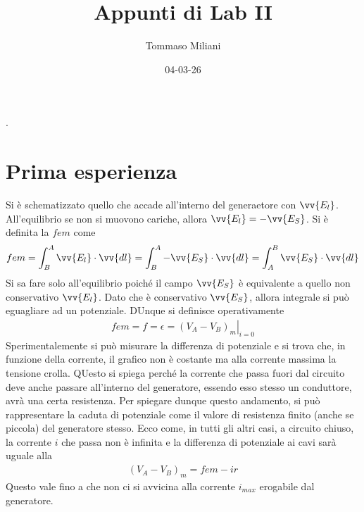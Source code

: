 \documentclass[a4paper, oneside]{article}
\title{Appunti di Lab II}
\author{Tommaso Miliani}
\date{04-03-26}
\begin{document}
                {}          %
                {}          %
                {\slshape}  %
                {}          %
                {\bfseries} %
                {.}         %
                {\newline}  %
                {}          %
\theoremstyle{theoremEnv}

\newtheorem{definition}{Definizione}[section]
\newtheorem{theorem}{Teorema}[section]
\newtheorem{lemma}{Proposizione}[section]
\newtheorem{observation}{Osservazione}[section]
\newtheorem{corollary}{Corollario}[theorem]
\newtheorem{example}{Esempio}[section]
\newtheorem{remark}{Enunciato}[section]

\maketitle

\section{Prima esperienza}
Si è schematizzato quello che accade all'interno del generaetore
con $\vv{E_l}$. All'equilibrio se non si muovono cariche, allora
$\vv{E_l} = - \vv{E_S}$. Si è definita la $fem$ come 
\begin{gather*}
    fem = \int_{B}^{A} \vv{E_l} \cdot \vv{dl}   = \int_{B}^{A} -\vv{E_S} \cdot \vv{dl} = \int_{A}^{B} \vv{E_S} \cdot \vv{dl}     
\end{gather*}   
Si sa fare solo all'equilibrio poiché il campo $\vv{E_S}$ è equivalente a quello 
non conservativo $\vv{E_l}$. Dato che è conservativo $\vv{E_S}$, allora integrale si può
eguagliare ad un potenziale. DUnque si definisce operativamente
\begin{gather*}
    fem = f = \epsilon = \left.(V_A - V_B)_m \right|_{i = 0 }
\end{gather*}
Sperimentalemente si può misurare la differenza di potenziale e si trova che, 
in funzione della corrente, il grafico non è costante ma alla corrente 
massima la tensione crolla. QUesto si spiega perché la corrente che passa fuori dal
circuito deve anche passare all'interno del generatore, essendo esso stesso 
un conduttore, avrà una certa resistenza. Per spiegare dunque questo andamento, 
si può rappresentare la caduta di potenziale come il valore di resistenza finito (anche
se piccola) del generatore stesso. Ecco come, in tutti gli altri casi, 
a circuito chiuso, la corrente $i$ che passa non è infinita e la differenza di potenziale
ai cavi sarà uguale alla 
\begin{gather*}
    (V_A - V_B)_m = fem - ir
\end{gather*}
Questo vale fino a che non ci si avvicina alla corrente  $i_{max}$ erogabile 
dal generatore. 
\end{document}
